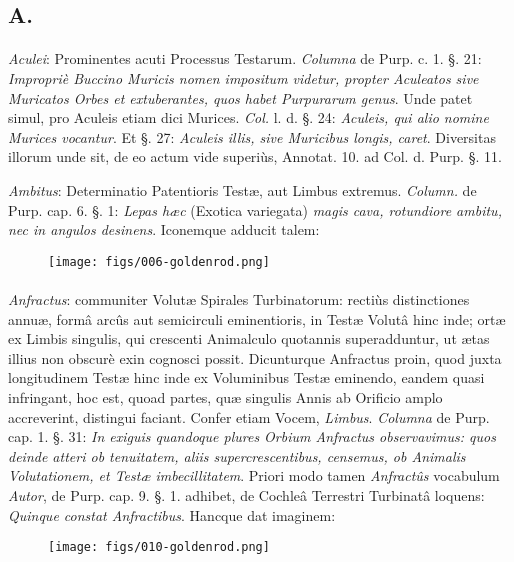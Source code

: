 \documentclass[a4paper, 11pt, oneside, polutonikogreek, german]{article}
\begin{document}
\bigskip

\subsection{A.}
\paragraph{}
\emph{Aculei}: Prominentes acuti Processus Testarum. \emph{Columna} de Purp. c. 1. §. 21: \emph{Impropriè Buccino Muricis nomen impositum videtur, propter Aculeatos sive Muricatos Orbes et extuberantes, quos habet Purpurarum genus}. Unde patet simul, pro Aculeis etiam dici Murices. \emph{Col.} l. d. §. 24: \emph{Aculeis, qui alio nomine Murices vocantur}. Et §. 27: \emph{Aculeis illis, sive Muricibus longis, caret}. Diversitas illorum unde sit, de eo actum vide superiùs, Annotat. 10. ad Col. d. Purp. §. 11.

\emph{Ambitus}: Determinatio Patentioris Testæ, aut Limbus extremus. \emph{Column.} de Purp. cap. 6. §. 1: \emph{Lepas hæc} (Exotica variegata) \emph{magis cava, rotundiore ambitu, nec in angulos desinens}. Iconemque adducit talem:

\begin{figure}[H]
\centering
\texttt{[image: figs/006-goldenrod.png]}
\end{figure}
\paragraph{}
\emph{Anfractus}: communiter Volutæ Spirales Turbinatorum: rectiùs distinctiones annuæ, formâ arcûs aut semicirculi eminentioris, in Testæ Volutâ hinc inde; ortæ ex Limbis singulis, qui crescenti Animalculo quotannis superadduntur, ut ætas illius non obscurè exin cognosci possit. Dicunturque Anfractus proin, quod juxta longitudinem Testæ hinc inde ex Voluminibus Testæ eminendo, eandem quasi infringant, hoc est, quoad partes, quæ singulis Annis ab Orificio amplo accreverint, distingui faciant. Confer etiam Vocem, \emph{Limbus}. \emph{Columna} de Purp. cap. 1. §. 31: \emph{In exiguis quandoque plures Orbium Anfractus observavimus: quos deinde atteri ob tenuitatem, aliis supercrescentibus, censemus, ob Animalis Volutationem, et Testæ imbecillitatem}. Priori modo tamen \emph{Anfractûs} vocabulum \emph{Autor}, de Purp. cap. 9. §. 1. adhibet, de Cochleâ Terrestri Turbinatâ loquens: \emph{Quinque constat Anfractibus}. Hancque dat imaginem:

\begin{figure}[H]
\centering
\texttt{[image: figs/010-goldenrod.png]}
\end{figure}
\end{document}
